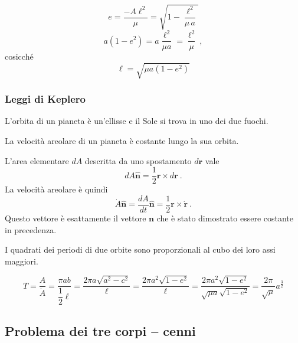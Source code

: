 \begin{equation}
    e = \dfrac{- A \ell^2}{\mu} = \sqrt{ 1 - \frac{\ell^2}{\mu \, a}}
\end{equation}
\begin{equation}
    a ( 1 - e^2 ) = a \frac{\ell^2}{\mu a} = \frac{\ell^2}{\mu} \ ,
\end{equation}
cosicché
\begin{equation}
    \ell = \sqrt{\mu a (1-e^2)}
\end{equation}




\subsubsection{Leggi di Keplero}
\begin{theorem} L'orbita di un pianeta è un'ellisse e il Sole si trova in uno dei due fuochi.
\end{theorem}
\begin{theorem} La velocità areolare di un pianeta è costante lungo la sua orbita.
\end{theorem}
L'area elementare $dA$ descritta da uno spostamento $d \mathbf{r}$ vale
\begin{equation}
    d A \mathbf{\hat{n}} = \frac{1}{2} \mathbf{r} \times d \mathbf{r}\ .
\end{equation}
La velocità areolare è quindi
\begin{equation}
    \dot{A} \mathbf{\hat{n}} = \dfrac{d A}{d t} \mathbf{\hat{n}} = \dfrac{1}{2} \mathbf{r} \times \dot{\mathbf{r}} \ .
\end{equation}
Questo vettore è esattamente il vettore $\mathbf{n}$ che è stato dimostrato essere costante in precedenza.


\begin{theorem} I quadrati dei periodi di due orbite sono proporzionali al cubo dei loro assi maggiori.
\end{theorem}
\begin{equation}
    T = \frac{A}{\dot{A}} = \dfrac{\pi a b}{\dfrac{1}{2} \ell} = \dfrac{2 \pi a \sqrt{a^2 - c^2}}{\ell} = \dfrac{2 \pi a^2 \sqrt{1 - e^2}}{\ell} = \dfrac{2 \pi a^2 \sqrt{1-e^2}}{\sqrt{\mu a }\sqrt{1-e^2}} = \frac{2\pi}{\sqrt{\mu}} a^{\frac{3}{2}}
\end{equation}

\subsection{Problema dei tre corpi -- cenni}


